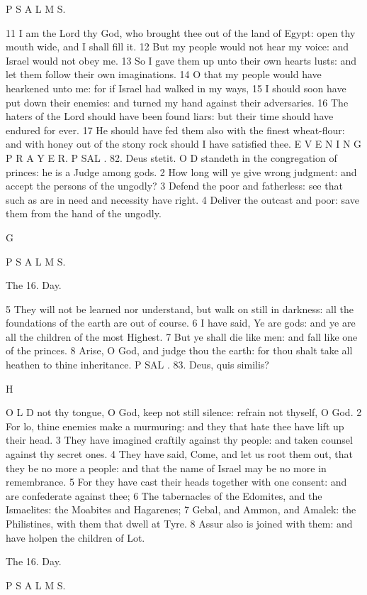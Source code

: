 P S A L M S.

11 I am the Lord thy God, who brought thee out of the land of Egypt: open thy mouth wide, and I shall fill it. 12 But my people would not hear my voice: and Israel would not obey me. 13 So I gave them up unto their own hearts lusts: and let them follow their own imaginations. 14 O that my people would have hearkened unto me: for if Israel had walked in my ways, 15 I should soon have put down their enemies: and turned my hand against their adversaries. 16 The haters of the Lord should have been found liars: but their time should have endured for ever. 17 He should have fed them also with the finest wheat-flour: and with honey out of the stony rock should I have satisfied thee. E V E N I N G P R A Y E R. P SAL . 82. Deus stetit. O D standeth in the congregation of princes: he is a Judge among gods. 2 How long will ye give wrong judgment: and accept the persons of the ungodly? 3 Defend the poor and fatherless: see that such as are in need and necessity have right. 4 Deliver the outcast and poor: save them from the hand of the ungodly.

G

P S A L M S.

The 16. Day.

5 They will not be learned nor understand, but walk on still in darkness: all the foundations of the earth are out of course. 6 I have said, Ye are gods: and ye are all the children of the most Highest. 7 But ye shall die like men: and fall like one of the princes. 8 Arise, O God, and judge thou the earth: for thou shalt take all heathen to thine inheritance. P SAL . 83. Deus, quis similis?

H

O L D not thy tongue, O God, keep not still silence: refrain not thyself, O God. 2 For lo, thine enemies make a murmuring: and they that hate thee have lift up their head. 3 They have imagined craftily against thy people: and taken counsel against thy secret ones. 4 They have said, Come, and let us root them out, that they be no more a people: and that the name of Israel may be no more in remembrance. 5 For they have cast their heads together with one consent: and are confederate against thee; 6 The tabernacles of the Edomites, and the Ismaelites: the Moabites and Hagarenes; 7 Gebal, and Ammon, and Amalek: the Philistines, with them that dwell at Tyre. 8 Assur also is joined with them: and have holpen the children of Lot.

The 16. Day.

P S A L M S.

